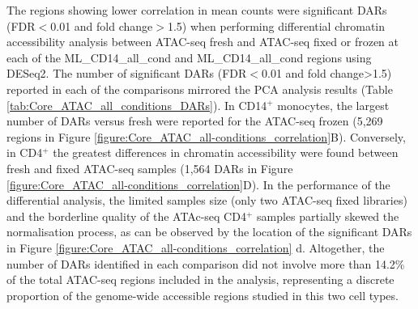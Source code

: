 	
The regions showing lower correlation in mean counts were significant DARs (FDR$<$0.01 and fold change$>$1.5) when performing differential chromatin accessibility analysis between ATAC-seq fresh and ATAC-seq fixed or frozen at each of the ML\_CD14\_all\_cond and ML\_CD14\_all\_cond regions using DESeq2. The number of significant DARs (FDR$<$0.01 and fold change>1.5) reported in each of the comparisons mirrored the PCA analysis results (Table \ref{tab:Core_ATAC_all_conditions_DARs}). In CD14$^+$ monocytes, the largest number of DARs versus fresh were reported for the ATAC-seq frozen (5,269 regions in Figure \ref{figure:Core_ATAC_all-conditions_correlation}B). Conversely, in CD4$^+$ the greatest differences in chromatin accessibility were found between fresh and fixed ATAC-seq samples (1,564 DARs in Figure \ref{figure:Core_ATAC_all-conditions_correlation}D). In the performance of the differential analysis, the limited samples size (only two ATAC-seq fixed libraries) and the borderline quality of the ATAc-seq CD4$^+$ samples partially skewed the normalisation process, as can be observed by the location of the significant DARs in Figure \ref{figure:Core_ATAC_all-conditions_correlation} d. Altogether, the number of DARs identified in each comparison did not involve more than 14.2\% of the total ATAC-seq regions included in the analysis, representing a discrete proportion of the genome-wide accessible regions studied in this two cell types.  


	
